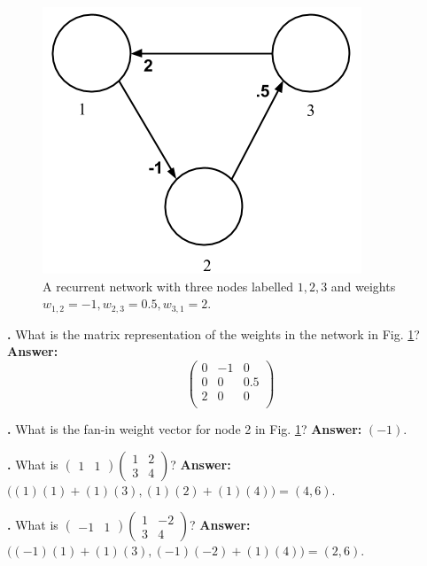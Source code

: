 \begin{figure}[h]
\centering
\includegraphics[scale=0.45]{./images/3NodeNet.png}
\caption[Jeff Yoshimi.]{A recurrent network with three nodes labelled $1,2,3$ and weights $w_{1,2} = -1, w_{2,3}=0.5, w_{3,1}=2$.}
\label{sampleNetRecurrent}
\end{figure}

\noindent
{}
{\bf \theLinearAlgebraCounter.}  What is the matrix representation of the weights in the network in Fig. \ref{sampleNetRecurrent}?
{\bf Answer:}  
\[
\begin{pmatrix}
 0  &   -1 & 0 \\
 0  &   0 & 0.5 \\
 2  &   0 & 0 \\
\end{pmatrix}
\]
\bigskip

\noindent
{}
{\bf \theLinearAlgebraCounter.}  What is the fan-in weight vector for node 2 in Fig. \ref{sampleNetRecurrent}?
{\bf Answer:}  $(-1)$. 
\bigskip

\noindent
{}
{\bf \theLinearAlgebraCounter.}  What is
$\begin{pmatrix}1 & 1\end{pmatrix}\begin{pmatrix} 1 & 2  \\ 3 & 4 \end{pmatrix}$?
{\bf Answer:}  $\Big((1)(1) + (1)(3), (1)(2) + (1)(4)\Big)  = (4,6)$. 
\bigskip

\noindent
{}
{\bf \theLinearAlgebraCounter.}  What is
$\begin{pmatrix}-1 & 1\end{pmatrix}\begin{pmatrix} 1 & -2  \\ 3 & 4 \end{pmatrix}$?
{\bf Answer:}  $\Big((-1)(1) + (1)(3), (-1)(-2) + (1)(4)\Big)  = (2,6)$. 
\bigskip

